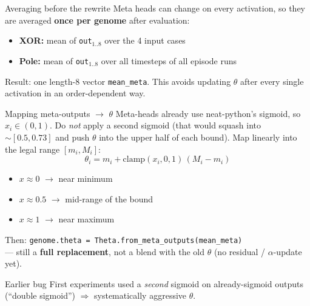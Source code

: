 \documentclass[aspectratio=169,11pt]{beamer}
\begin{document}
\begin{frame}{Averaging before the rewrite}
  Meta heads can change on every activation, so they are averaged
  \textbf{once per genome} after evaluation:

  \vspace{0.5em}
  \begin{itemize}
    \item \textbf{XOR:} mean of \texttt{out}$_{1..8}$ over the 4 input cases
    \item \textbf{Pole:} mean of \texttt{out}$_{1..8}$ over all timesteps of all episode runs
  \end{itemize}

  \vspace{0.5em}
  Result: one length-$8$ vector \texttt{mean\_meta}.
  This avoids updating $\theta$ after every single activation in an order-dependent way.
\end{frame}

\begin{frame}{Mapping meta-outputs $\rightarrow$ $\theta$}
  Meta-heads already use neat-python's sigmoid, so $x_i\in(0,1)$.
  Do \emph{not} apply a second sigmoid (that would squash into $\sim[0.5,0.73]$
  and push $\theta$ into the upper half of each bound).
  Map linearly into the legal range $[m_i,M_i]$:
  \[
    \theta_i = m_i + \mathrm{clamp}(x_i,0,1)\,(M_i - m_i)
  \]

  \vspace{0.4em}
  \begin{itemize}
    \item $x \approx 0$ $\rightarrow$ near minimum
    \item $x \approx 0.5$ $\rightarrow$ mid-range of the bound
    \item $x \approx 1$ $\rightarrow$ near maximum
  \end{itemize}

  \vspace{0.4em}
  Then: \texttt{genome.theta = Theta.from\_meta\_outputs(mean\_meta)}\\
  --- still a \textbf{full replacement}, not a blend with the old $\theta$
  (no residual / $\alpha$-update yet).

  \vspace{0.4em}
  \begin{alertblock}{Earlier bug}
    First experiments used a \emph{second} sigmoid on already-sigmoid outputs
    (``double sigmoid'') $\Rightarrow$ systematically aggressive $\theta$.
  \end{alertblock}
\end{frame}
\end{document}
